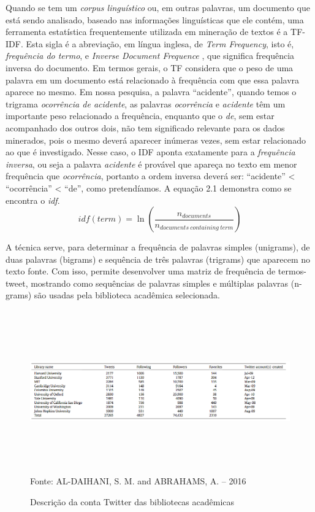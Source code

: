 Quando se tem um \textit{corpus linguístico} ou, em outras palavras, um documento que está sendo analisado, baseado nas informações linguísticas que ele contém, uma ferramenta estatística frequentemente utilizada em mineração de textos é a TF-IDF. Esta sigla é a abreviação, em língua inglesa, de \textit{Term Frequency}, isto é, \textit{frequência do termo}, e \textit{Inverse Document Frequence} \cite{hiemstra2000probabilistic}, que significa frequência inversa do documento. Em termos gerais, o TF considera que o peso de uma palavra em um documento está relacionado à frequência com que essa palavra aparece no mesmo. Em nossa pesquisa, a palavra ``acidente'', quando temos o trigrama \textit{ocorrência de acidente}, as palavras \textit{ocorrência} e \textit{acidente} têm um importante peso relacionado a frequência, enquanto que o \textit{de}, sem estar acompanhado dos outros dois, não tem significado relevante para os dados minerados, pois o mesmo deverá aparecer inúmeras vezes, sem estar relacionado ao que é investigado. Nesse caso, o IDF aponta exatamente para a \textit{frequência inversa}, ou seja a palavra \textit{acidente} é provável que apareça no texto em menor frequência que \textit{ocorrência}, portanto a ordem inversa  deverá ser: ``acidente'' < ``ocorrência'' < ``de'', como pretendíamos. 
A equação 2.1 demonstra como se encontra o \textit{idf}.
\begin{equation}
idf(term) = \ln(\frac{n_{documents}}{n_{documents\  containing \ term}})
\end{equation}

 A técnica serve, para determinar a frequência de palavras simples (unigrams), de duas palavras (bigrams) e sequência de três palavras (trigrams) que aparecem no texto fonte. Com isso, permite desenvolver uma matriz de frequência de termos-tweet, mostrando como sequências de palavras simples e múltiplas palavras (n-grams) são usadas pela biblioteca acadêmica selecionada. 



\begin{figure}[htbp!]
	\centering
	\caption{Descrição da conta Twitter das bibliotecas acadêmicas}
	\includegraphics[width=175mm, height=70mm]{Figuras/Twitter/contaTwitter.png}\\
	\tiny Fonte: AL-DAIHANI, S. M. and ABRAHAMS, A. -- 2016
\end{figure}

